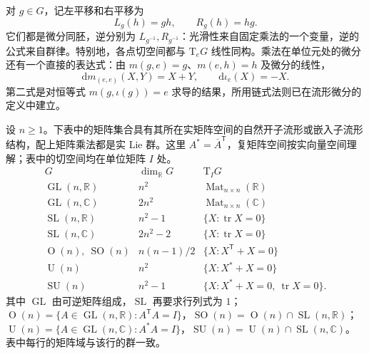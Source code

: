 \ProseParagraphBreak

对 \(g\in G\)，记左平移和右平移为
\[
	L_g(h)=gh,\qquad R_g(h)=hg.
\]
它们都是微分同胚，逆分别为 \(L_{g^{-1}},R_{g^{-1}}\)：光滑性来自固定乘法的一个变量，逆的公式来自群律。特别地，各点切空间都与 \(\mathrm{T}_eG\) 线性同构。乘法在单位元处的微分还有一个直接的表达式：由 \(m(g,e)=g\)、\(m(e,h)=h\) 及微分的线性，
\begin{equation}\label{g1:eq:lie-group-unit-differentials}
	\mathrm{d}m_{(e,e)}(X,Y)=X+Y,\qquad \mathrm{d}\iota_e(X)=-X.
\end{equation}
第二式是对恒等式 \(m(g,\iota(g))=e\) 求导的结果，所用链式法则已在流形微分的定义中建立。

\begin{proposition}\label{g1:prop:matrix-classical-lie-groups}
	设 \(n\geq1\)。下表中的矩阵集合具有其所在实矩阵空间的自然开子流形或嵌入子流形结构，配上矩阵乘法都是实 Lie 群。这里 \(A^*=\overline A^{\mathsf T}\)，复矩阵空间按实向量空间理解；表中的切空间均在单位矩阵 \(I\) 处。
	\[
		\begin{array}{c|c|c}
			G&\dim_{\mathbb R}G&\mathrm{T}_IG\\ \hline
			\operatorname{GL}(n,\mathbb R)&n^2&\operatorname{Mat}_{n\times n}(\mathbb R)\\
			\operatorname{GL}(n,\mathbb C)&2n^2&\operatorname{Mat}_{n\times n}(\mathbb C)\\
			\operatorname{SL}(n,\mathbb R)&n^2-1&\{X:\operatorname{tr}X=0\}\\
			\operatorname{SL}(n,\mathbb C)&2n^2-2&\{X:\operatorname{tr}X=0\}\\
			\operatorname{O}(n),\ \operatorname{SO}(n)&n(n-1)/2&\{X:X^{\mathsf T}+X=0\}\\
			\operatorname{U}(n)&n^2&\{X:X^*+X=0\}\\
			\operatorname{SU}(n)&n^2-1&\{X:X^*+X=0,\ \operatorname{tr}X=0\}.
		\end{array}
	\]
	其中 \(\operatorname{GL}\) 由可逆矩阵组成，\(\operatorname{SL}\) 再要求行列式为 \(1\)；\(\operatorname{O}(n)=\{A\in\operatorname{GL}(n,\mathbb R):A^{\mathsf T}A=I\}\)，\(\operatorname{SO}(n)=\operatorname{O}(n)\cap\operatorname{SL}(n,\mathbb R)\)；\(\operatorname{U}(n)=\{A\in\operatorname{GL}(n,\mathbb C):A^*A=I\}\)，\(\operatorname{SU}(n)=\operatorname{U}(n)\cap\operatorname{SL}(n,\mathbb C)\)。表中每行的矩阵域与该行的群一致。
\end{proposition}
